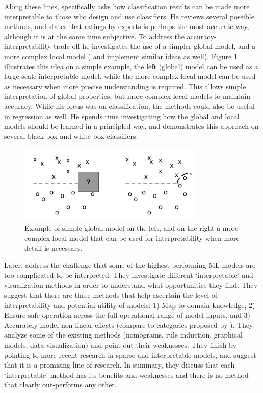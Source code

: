     Along these lines,  \citet{Ruping2006-xj} specifically asks how classification results can be made more interpretable to those who design and use classifiers. He reviews several possible methods, and states that ratings by experts is perhaps the most accurate way, although it is at the same time subjective. To address the accuracy-interpretability trade-off he investigates the use of a simpler global model, and a more complex local model (\citet{Otte2013-oo} and \citet{Ribeiro2016-uc} implement similar ideas as well). Figure \ref{fig:ruping} illustrates this idea on a simple example, the left (global) model can be used as a large scale interpretable model, while the more complex local model can be used as necessary when more precise understanding is required. This allows simple interpretation of global properties, but more complex local models to maintain accuracy. While his focus was on classification, the methods could also be useful in regression as well. He spends time investigating how the global and local models should be learned in a principled way, and demonstrates this approach on several black-box and white-box classifiers. 

    \begin{figure}[htbp]
    \centering
    \includegraphics[width=0.8\textwidth]{Figures/global_local}
    \caption{Example of simple global model on the left, and on the right a more complex local model that can be used for interpretability when more detail is necessary.}
    \label{fig:ruping}
    \end{figure}

    Later, \citet{Van_Belle2013-ph} address the challenge that some of the highest performing ML models are too complicated to be interpreted. They investigate different `interpretable' and visualization methods in order to understand what opportunities they find. They suggest that there are three methods that help ascertain the level of interpretability and potential utility of models: 1) Map to domain knowledge, 2) Ensure safe operation across the full operational range of model inputs, and 3) Accurately model non-linear effects (compare to categories proposed by \citet{Lipton2016-ug}). They analyze some of the existing methods (nomograms, rule induction, graphical models, data visualization) and point out their weaknesses. They finish by pointing to more recent research in sparse and interpretable models, and suggest that it is a promising line of research. In summary, they discuss that each `interpretable' method has its benefits and weaknesses and there is no method that clearly out-performs any other.

